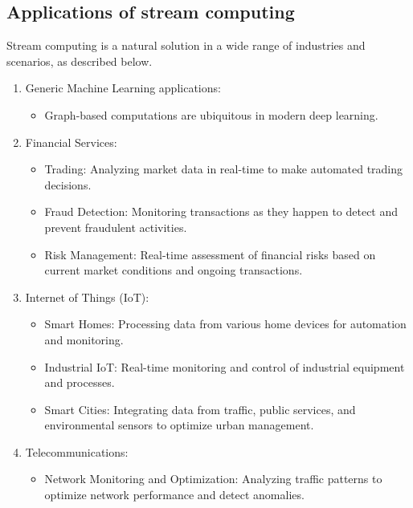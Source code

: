 \documentclass[11pt, reqno]{amsart}
\theoremstyle{definition}
\theoremstyle{remark}
\begin{document}
  \subsection{Applications of stream computing}

  Stream computing is a natural solution in a wide range of industries and scenarios,
  as described below.

  \begin{enumerate}
    \item Generic Machine Learning applications:
      \begin{itemize}
        \item Graph-based computations are ubiquitous in modern deep learning.
      \end{itemize}

    \item Financial Services:
      \begin{itemize}
        \item Trading: Analyzing market data in real-time to make automated
          trading decisions.

        \item Fraud Detection: Monitoring transactions as they happen to detect
          and prevent fraudulent activities.

        \item Risk Management: Real-time assessment of financial risks based on
          current market conditions and ongoing transactions.
      \end{itemize}

    \item Internet of Things (IoT):
      \begin{itemize}
        \item Smart Homes: Processing data from various home devices for
          automation and monitoring.

        \item Industrial IoT: Real-time monitoring and control of industrial
          equipment and processes.

        \item Smart Cities: Integrating data from traffic, public services, and
          environmental sensors to optimize urban management.
      \end{itemize}

    \item Telecommunications:
      \begin{itemize}
        \item Network Monitoring and Optimization: Analyzing traffic patterns to
          optimize network performance and detect anomalies.


\end{itemize}
\end{enumerate}
\end{document}
